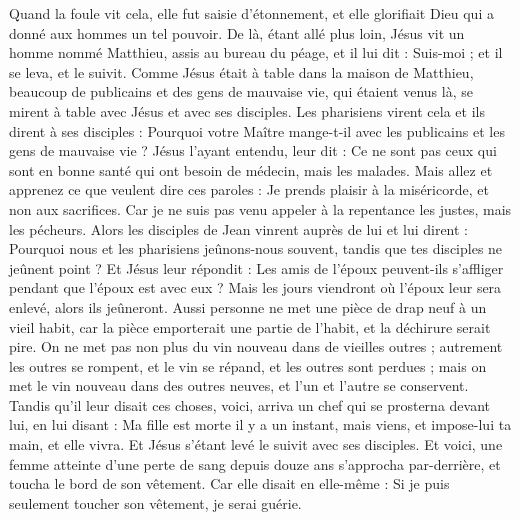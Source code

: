 \begin{multicols}{2}
Quand la foule vit cela, elle fut saisie d’étonnement, et elle glorifiait Dieu qui a donné aux hommes un tel pouvoir.
De là, étant allé plus loin, Jésus vit un homme nommé Matthieu, assis au bureau du péage, et il lui dit : Suis-moi ; et il se leva, et le suivit.
Comme Jésus était à table dans la maison de Matthieu, beaucoup de publicains et des gens de mauvaise vie, qui étaient venus là, se mirent à table avec Jésus et avec ses disciples.
Les pharisiens virent cela et ils dirent à ses disciples : Pourquoi votre Maître mange-t-il avec les publicains et les gens de mauvaise vie ?
Jésus l'ayant entendu, leur dit : Ce ne sont pas ceux qui sont en bonne santé qui ont besoin de médecin, mais les malades.
Mais allez et apprenez ce que veulent dire ces paroles : Je prends plaisir à la miséricorde, et non aux sacrifices{}. Car je ne suis pas venu appeler à la repentance les justes, mais les pécheurs.
Alors les disciples de Jean vinrent auprès de lui et lui dirent : Pourquoi nous et les pharisiens jeûnons-nous souvent, tandis que tes disciples ne jeûnent point ?
Et Jésus leur répondit : Les amis de l’époux peuvent-ils s'affliger pendant que l’époux est avec eux ? Mais les jours viendront où l’époux leur sera enlevé, alors ils jeûneront.
Aussi personne ne met une pièce de drap neuf à un vieil habit, car la pièce emporterait une partie de l’habit, et la déchirure serait pire.
On ne met pas non plus du vin nouveau dans de vieilles outres ; autrement les outres se rompent, et le vin se répand, et les outres sont perdues ; mais on met le vin nouveau dans des outres neuves, et l'un et l'autre se conservent.
Tandis qu’il leur disait ces choses, voici, arriva un chef qui se prosterna devant lui, en lui disant : Ma fille est morte il y a un instant, mais viens, et impose-lui ta main, et elle vivra.
Et Jésus s'étant levé le suivit avec ses disciples.
Et voici, une femme atteinte d'une perte de sang depuis douze ans s’approcha par-derrière, et toucha le bord de son vêtement.
Car elle disait en elle-même : Si je puis seulement toucher son vêtement, je serai guérie.

\end{multicols}
